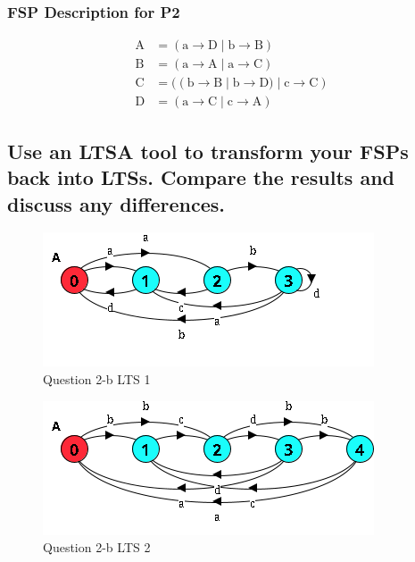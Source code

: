 \documentclass{article}[8pt]
\renewcommand{\thesubsubsection}{\thesection.\alph{subsection}.\Roman{subsubsection}}
\renewcommand{\thesubsection}{\thesection.\alph{subsection}}
\begin{document}
\subsubsection[~\thesubsubsection]{FSP Description for P2}

\begin{align*}
	\text{A} &= (\text{a} \rightarrow \text{D} \; | \; \text{b} \rightarrow \text{B}) \\
	\text{B} &= (\text{a} \rightarrow \text{A} \; | \; \text{a} \rightarrow \text{C}) \\
	\text{C} &= ((\text{b} \rightarrow \text{B} \; | \; \text{b} \rightarrow \text{D}) \; | \; \text{c} \rightarrow \text{C}) \\
	\text{D} &= (\text{a} \rightarrow \text{C} \; | \; \text{c} \rightarrow \text{A})
\end{align*}

\subsection[~\thesubsection]{Use an LTSA tool to transform your FSPs back into LTSs. Compare the results and discuss any differences.}

\begin{figure}[H]
	\includegraphics{./imgs/Question-2-b-i.png}
	\caption{Question 2-b LTS 1}
	\label{fig:Question-2-b-i-LTS}
\end{figure}

\begin{figure}[H]
	\includegraphics{./imgs/Question-2-b-ii.png}
	\caption{Question 2-b LTS 2}
	\label{fig:Question-2-b-ii-LTS}
\end{figure}
\end{document}
